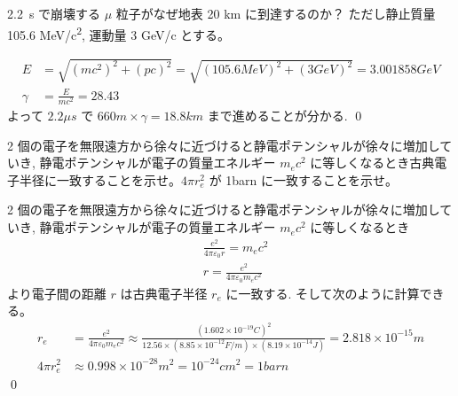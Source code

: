 \documentclass[uplatex,dvipdfmx,a4paper,11pt]{jlreq}
\makeatletter
\numberwithin{equation}{section}
\theoremstyle{definition}
\renewenvironment{proof}[1][\proofname]{\par
  \normalfont
  \topsep6\p@\@plus6\p@ \trivlist
  \item[\hskip\labelsep{\bfseries #1}\@addpunct{\bfseries}]\ignorespaces\quad\par
}{%
  \qed\endtrivlist\@endpefalse
}
\renewcommand\proofname{証明}
\makeatother
\begin{document}
\begin{problem}
2.2\si{\mu s} で崩壊する $\mu$ 粒子がなぜ地表 20 \si{km} に到達するのか？
ただし静止質量 105.6 \si{MeV/c^2}, 運動量 3 \si{GeV/c} とする。
\end{problem}
\begin{proof}
  \begin{align}
    E      & = \sqrt{(mc^2)^2 + (pc)^2} = \sqrt{(105.6 \si{MeV})^2 + (3 \si{GeV})^2} = 3.001858 \si{GeV} \\
    \gamma & = \frac{E}{mc^2} = 28.43
  \end{align}
  よって $2.2\si{\mu s}$ で $660\si{m}\times\gamma = 18.8\si{km}$ まで進めることが分かる.
\end{proof}

\begin{problem}
2 個の電子を無限遠方から徐々に近づけると静電ポテンシャルが徐々に増加していき, 静電ポテンシャルが電子の質量エネルギー $m_ec^2$ に等しくなるとき古典電子半径に一致することを示せ。$4\pi r_e^2$ が 1\si{barn} に一致することを示せ。
\end{problem}
\begin{proof}
  2 個の電子を無限遠方から徐々に近づけると静電ポテンシャルが徐々に増加していき, 静電ポテンシャルが電子の質量エネルギー $m_ec^2$ に等しくなるとき
  \begin{align}
     & \frac{e^2}{4\pi\varepsilon_0 r} = m_ec^2 \\
     & r = \frac{e^2}{4\pi\varepsilon_0m_ec^2}
  \end{align}
  より電子間の距離 $r$ は古典電子半径 $r_e$ に一致する. そして次のように計算できる。
  \begin{align}
    r_e        & = \frac{e^2}{4\pi\varepsilon_0m_ec^2} \approx \frac{(1.602\times 10^{-19}\si{C})^2}{12.56\times(8.85\times 10^{-12}\si{F/m})\times(8.19\times 10^{-14}\si{J})} = 2.818 \times 10^{-15}\si{m} \\
    4\pi r_e^2 & \approx 0.998 \times 10^{-28}\si{m^2} = 10^{-24}\si{cm^2} = 1\si{barn}
  \end{align}
\end{proof}
\end{document}
